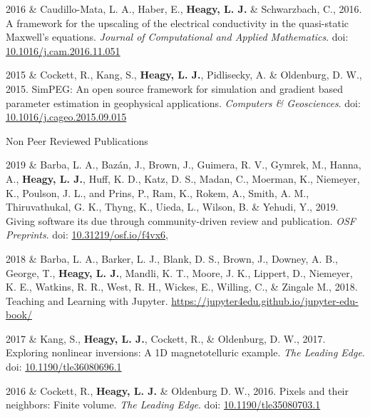 \documentclass[a4paper, 11pt]{article}
\newcommand{\doi}[1]{doi: \href{https://doi.org/#1}{#1}}
\newcommand{\subheading}[1]{
    \vspace{0.5cm}
    {\Large #1}\\
    \vspace{-0.2cm}
}
\begin{document}
\begin{entryright}
2016 & Caudillo-Mata, L. A., Haber, E., \textbf{Heagy, L. J.} \& Schwarzbach, C., 2016. A framework for the upscaling of the electrical conductivity in the quasi-static Maxwell's equations. \emph{Journal of Computational and Applied Mathematics}. \doi{10.1016/j.cam.2016.11.051}
\end{entryright}

\begin{entryright}
2015 & Cockett, R., Kang, S., \textbf{Heagy, L. J.}, Pidlisecky, A. \& Oldenburg, D. W., 2015. SimPEG: An open source framework for simulation and gradient based parameter estimation in geophysical applications. \emph{Computers \& Geosciences}. \doi{10.1016/j.cageo.2015.09.015}
\end{entryright}


\subheading{Non Peer Reviewed Publications}

\begin{entryright}
2019 & Barba, L. A., Baz\'an, J., Brown, J., Guimera, R. V., Gymrek, M., Hanna, A., \textbf{Heagy, L. J.}, Huff, K. D., Katz, D. S., Madan, C., Moerman, K., Niemeyer, K., Poulson, J. L., and Prins, P., Ram, K., Rokem, A., Smith, A. M., Thiruvathukal, G. K., Thyng, K., Uieda, L., Wilson, B. \& Yehudi, Y.,
2019. Giving software its due through community-driven review and publication. \emph{OSF Preprints}. \doi{10.31219/osf.io/f4vx6},
\end{entryright}

\begin{entryright}
2018 & Barba, L. A., Barker, L. J., Blank, D. S., Brown, J., Downey, A. B., George, T., \textbf{Heagy, L. J.},  Mandli, K. T., Moore, J. K., Lippert, D.,  Niemeyer, K. E., Watkins, R. R., West, R. H., Wickes, E., Willing, C., \& Zingale M., 2018. Teaching and Learning with Jupyter. \href{https://jupyter4edu.github.io/jupyter-edu-book/}{https://jupyter4edu.github.io/jupyter-edu-book/}
\end{entryright}

\begin{entryright}
2017 & Kang, S., \textbf{Heagy, L. J.}, Cockett, R., \& Oldenburg, D. W., 2017. Exploring nonlinear inversions: A 1D magnetotelluric example. \emph{The Leading Edge}. \doi{10.1190/tle36080696.1}
\end{entryright}

\begin{entryright}
2016 & Cockett, R., \textbf{Heagy, L. J.} \& Oldenburg D. W., 2016. Pixels and their neighbors: Finite volume. \emph{The Leading Edge}. \doi{10.1190/tle35080703.1}
\end{entryright}
\end{document}
